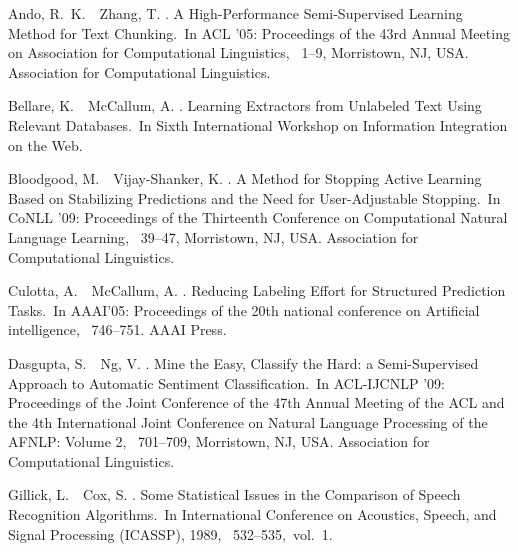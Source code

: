 \documentclass[english]{jnlp_JS2.0}
\begin{document}

\begin{thebibliography}{}

Ando, R.~K.\BBACOMMA\ \BBA\ Zhang, T. \BBCP.
\newblock \BBOQ A High-Performance Semi-Supervised Learning Method for Text
  Chunking.\BBCQ\
\newblock In {\Bem ACL '05: Proceedings of the 43rd Annual Meeting on
  Association for Computational Linguistics}, \mbox{\BPGS\ 1--9}, Morristown,
  NJ, USA. Association for Computational Linguistics.

Bellare, K.\BBACOMMA\ \BBA\ McCallum, A. \BBOP 2007\BBCP.
\newblock \BBOQ Learning Extractors from Unlabeled Text Using Relevant
  Databases.\BBCQ\
\newblock In {\Bem Sixth International Workshop on Information Integration on
  the Web}.

Bloodgood, M.\BBACOMMA\ \BBA\ Vijay-Shanker, K. \BBCP.
\newblock \BBOQ A Method for Stopping Active Learning Based on Stabilizing
  Predictions and the Need for User-Adjustable Stopping.\BBCQ\
\newblock In {\Bem CoNLL '09: Proceedings of the Thirteenth Conference on
  Computational Natural Language Learning}, \mbox{\BPGS\ 39--47}, Morristown,
  NJ, USA. Association for Computational Linguistics.

Culotta, A.\BBACOMMA\ \BBA\ McCallum, A. \BBOP 2005\BBCP.
\newblock \BBOQ Reducing Labeling Effort for Structured Prediction Tasks.\BBCQ\
\newblock In {\Bem AAAI'05: Proceedings of the 20th national conference on
  Artificial intelligence}, \mbox{\BPGS\ 746--751}. AAAI Press.

Dasgupta, S.\BBACOMMA\ \BBA\ Ng, V. \BBCP.
\newblock \BBOQ Mine the Easy, Classify the Hard: a Semi-Supervised Approach to
  Automatic Sentiment Classification.\BBCQ\
\newblock In {\Bem ACL-IJCNLP '09: Proceedings of the Joint Conference of the
  47th Annual Meeting of the ACL and the 4th International Joint Conference on
  Natural Language Processing of the AFNLP: Volume 2}, \mbox{\BPGS\ 701--709},
  Morristown, NJ, USA. Association for Computational Linguistics.

Gillick, L.\BBACOMMA\ \BBA\ Cox, S. \BBOP 1989\BBCP.
\newblock \BBOQ Some Statistical Issues in the Comparison of Speech Recognition
  Algorithms.\BBCQ\
\newblock In {\Bem International Conference on Acoustics, Speech, and Signal
  Processing (ICASSP), 1989}, \mbox{\BPGS\ 532--535, vol.~1}.


\end{thebibliography}
\end{document}
